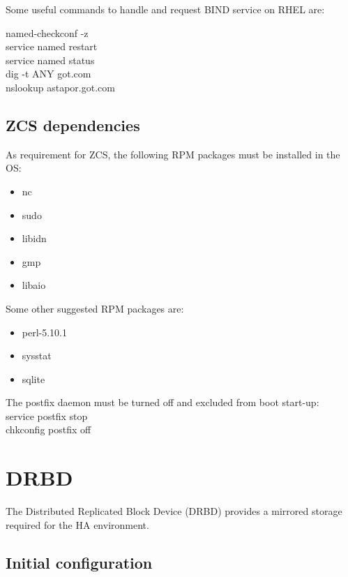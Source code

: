 \documentclass[a4paper, 12pt]{book}
\begin{document}
\noindent Some useful commands to handle and request BIND service on RHEL are:

named-checkconf -z \\
service named restart \\
service named status \\
dig -t ANY got.com \\
nslookup astapor.got.com \\


\subsection{ZCS dependencies}
\label{sec:zcsdeps}

As requirement for ZCS, the following RPM packages must be installed in the OS:

\begin{itemize}
	\item nc
	\item sudo
	\item libidn 
	\item gmp 
	\item libaio 
\end{itemize}

\noindent Some other suggested RPM packages are:

\begin{itemize}
	\item perl-5.10.1
	\item sysstat 
	\item sqlite 
\end{itemize}

\noindent The postfix daemon must be turned off and excluded from boot start-up:\\
service postfix stop\\
chkconfig postfix off\\


\section{DRBD}
\label{sec:drbd}

\noindent The Distributed Replicated Block Device (DRBD) provides a mirrored storage required for the HA environment.


\subsection{Initial configuration}
\label{sec:initialconf}
\end{document}
